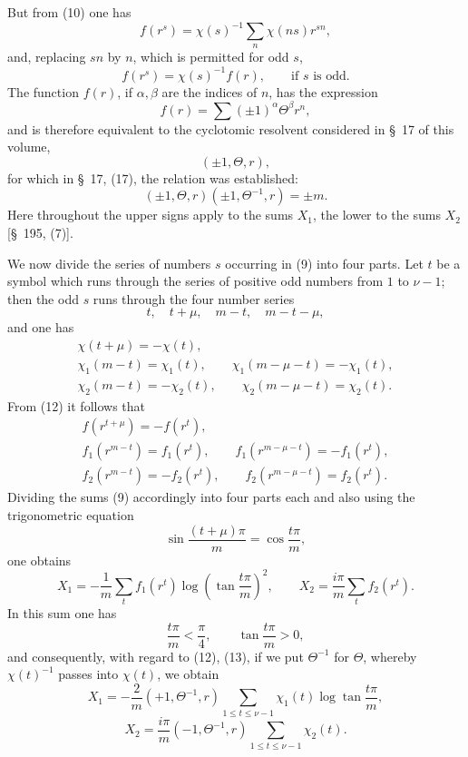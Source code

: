 \documentclass[11pt]{article}
\begin{document}
But from (10) one has
\[
f(r^s)=\chi(s)^{-1}\sum_n\chi(ns)r^{sn},
\]
and, replacing $sn$ by $n$, which is permitted for odd $s$,
\begin{equation}
f(r^s)=\chi(s)^{-1}f(r),\qquad\text{if }s\text{ is odd}.
\tag{12}
\end{equation}
The function $f(r)$, if $\alpha,\beta$ are the indices of $n$, has the expression
\begin{equation}
f(r)=\sum(\pm1)^\alpha\Theta^\beta r^n,
\tag{13}
\end{equation}
and is therefore equivalent to the cyclotomic resolvent considered in \S~17 of this volume,
\[
(\pm1,\Theta,r),
\]
for which in \S~17, (17), the relation was established:
\begin{equation}
(\pm1,\Theta,r)(\pm1,\Theta^{-1},r)=\pm m.
\tag{14}
\end{equation}
Here throughout the upper signs apply to the sums $X_1$, the lower to the sums $X_2$ [\S~195, (7)].

We now divide the series of numbers $s$ occurring in (9) into four parts. Let $t$ be a symbol which runs through the
series of positive odd numbers from $1$ to $\nu-1$; then the odd $s$ runs through the four number series
\[
t,
\quad t+\mu,
\quad m-t,
\quad m-t-\mu,
\]
and one has
\[
\begin{gathered}
\chi(t+\mu)=-\chi(t),\\
\chi_1(m-t)=\chi_1(t),\qquad \chi_1(m-\mu-t)=-\chi_1(t),\\
\chi_2(m-t)=-\chi_2(t),\qquad \chi_2(m-\mu-t)=\chi_2(t).
\end{gathered}
\]
From (12) it follows that
\[
\begin{gathered}
f(r^{t+\mu})=-f(r^t),\\
f_1(r^{m-t})=f_1(r^t),\qquad f_1(r^{m-\mu-t})=-f_1(r^t),\\
f_2(r^{m-t})=-f_2(r^t),\qquad f_2(r^{m-\mu-t})=f_2(r^t).
\end{gathered}
\]
Dividing the sums (9) accordingly into four parts each and also using the trigonometric equation
\[
\sin\frac{(t+\mu)\pi}{m}=\cos\frac{t\pi}{m},
\]
one obtains
\[
X_1=-\frac1m\sum_t f_1(r^t)\log\left(\tan\frac{t\pi}{m}\right)^2,
\qquad
X_2=\frac{i\pi}{m}\sum_t f_2(r^t).
\]
In this sum one has
\[
\frac{t\pi}{m}<\frac\pi4,
\qquad
\tan\frac{t\pi}{m}>0,
\]
and consequently, with regard to (12), (13), if we put $\Theta^{-1}$ for $\Theta$, whereby $\chi(t)^{-1}$ passes into $\chi(t)$, we obtain
\begin{equation}
X_1=-\frac2m(+1,\Theta^{-1},r)
\sum_{1\le t\le\nu-1}\chi_1(t)\log\tan\frac{t\pi}{m},
\tag{15}
\end{equation}
\begin{equation}
X_2=\frac{i\pi}{m}(-1,\Theta^{-1},r)
\sum_{1\le t\le\nu-1}\chi_2(t).
\tag{16}
\end{equation}
\end{document}
